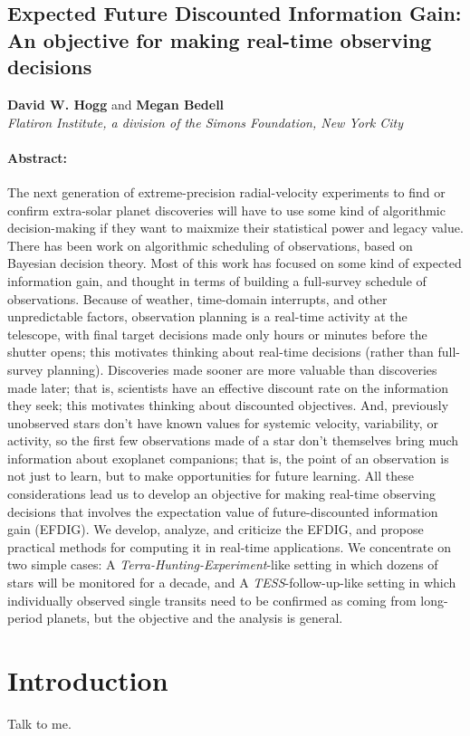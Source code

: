 \documentclass[12pt]{article}
\begin{document}
\frenchspacing\raggedbottom\sloppy\sloppypar

\subsection*{Expected Future Discounted Information Gain:\\
An objective for making real-time observing decisions}

\noindent
\textbf{David W. Hogg} and \textbf{Megan Bedell}\\
\textsl{Flatiron Institute, a division of the Simons Foundation, New York City}

\paragraph{Abstract:}
The next generation of extreme-precision radial-velocity experiments to find or
confirm extra-solar planet discoveries will have to use some kind of algorithmic
decision-making if they want to maixmize their statistical power and legacy value.
There has been work on algorithmic scheduling of observations,
based on Bayesian decision theory.
Most of this work has focused on some kind of expected information gain,
and thought in terms of building a full-survey schedule of
observations.
Because of weather, time-domain interrupts, and other
unpredictable factors, observation planning is a real-time activity at the telescope,
with final target decisions made only hours or minutes before the shutter opens;
this motivates thinking about real-time decisions (rather than full-survey planning).
Discoveries made sooner are more valuable than discoveries
made later; that is, scientists have an effective discount rate on the information
they seek; this motivates thinking about discounted objectives.
And, previously unobserved stars don't have known values for systemic velocity,
variability, or activity, so the first few observations made of a star don't themselves
bring much information about exoplanet companions; that is, the point of an observation
is not just to learn, but to make opportunities for future learning.
All these considerations lead us to develop an objective for making real-time observing
decisions that involves the expectation value of future-discounted information gain (EFDIG).
We develop, analyze, and criticize the EFDIG, and propose practical methods for computing
it in real-time applications.
We concentrate on two simple cases:
A \textsl{Terra-Hunting-Experiment}-like setting in which
dozens of stars will be monitored for a decade,
and A \textsl{TESS}-follow-up-like setting in which
individually observed single transits need to be confirmed as coming from long-period planets,
but the objective and the analysis is general.

\section{Introduction}

Talk to me.
\end{document}
